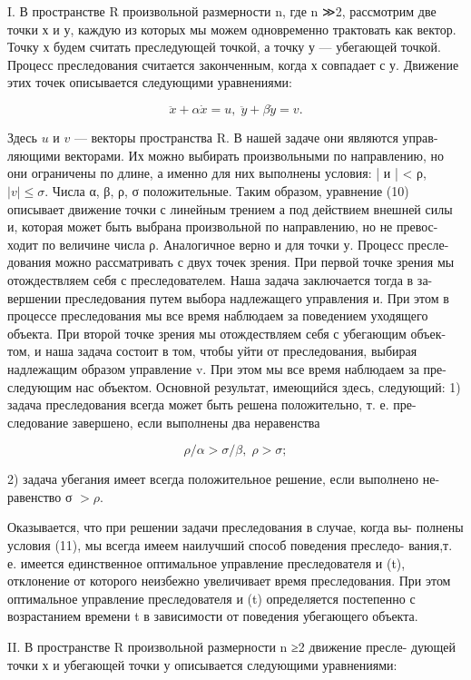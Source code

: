 \documentclass[10pt]{article}
\begin{document}
I. В пространстве R произвольной размерности n, где n ≫2, рассмотрим две точки х и у, каждую из которых мы можем одновременно трактовать как вектор. Точку х будем считать преследующей точкой, а точку у — убегающей точкой. Процесс преследования считается законченным, когда х совпадает с у. Движение этих точек описывается следующими уравнениями:

\[
\ddot{x} + \alpha \dot{x} = u,\;\ddot{y} + \beta \dot{y} = v. \tag{10}
\]

Здесь \(u\) и \(v\) — векторы пространства R. В нашей задаче они являются управ- ляющими векторами. Их можно выбирать произвольными по направлению, но они ограничены по длине, а именно для них выполнены условия: | и | < ρ, \(\left| v\right|  \leq  \sigma\). Числа α, β, ρ, σ положительные. Таким образом, уравнение (10) описывает движение точки с линейным трением а под действием внешней силы и, которая может быть выбрана произвольной по направлению, но не превос- ходит по величине числа ρ. Аналогичное верно и для точки у. Процесс пресле- дования можно рассматривать с двух точек зрения. При первой точке зрения мы отождествляем себя с преследователем. Наша задача заключается тогда в за- вершении преследования путем выбора надлежащего управления и. При этом в процессе преследования мы все время наблюдаем за поведением уходящего объекта. При второй точке зрения мы отождествляем себя с убегающим объек- том, и наша задача состоит в том, чтобы уйти от преследования, выбирая надлежащим образом управление v. При этом мы все время наблюдаем за пре- следующим нас объектом. Основной результат, имеющийся здесь, следующий: 1) задача преследования всегда может быть решена положительно, т. е. пре- следование завершено, если выполнены два неравенства

\[
\rho /\alpha  > \sigma /\beta,\;\rho  > \sigma ; \tag{11}
\]

2) задача убегания имеет всегда положительное решение, если выполнено не- равенство σ \(> \rho\).

Оказывается, что при решении задачи преследования в случае, когда вы- полнены условия (11), мы всегда имеем наилучший способ поведения преследо- вания,т. е. имеется единственное оптимальное управление преследователя и (t), отклонение от которого неизбежно увеличивает время преследования. При этом оптимальное управление преследователя и (t) определяется постепенно с возрастанием времени t в зависимости от поведения убегающего объекта.

II. В пространстве R произвольной размерности n ≥2 движение пресле- дующей точки х и убегающей точки у описывается следующими уравнениями:
\end{document}
